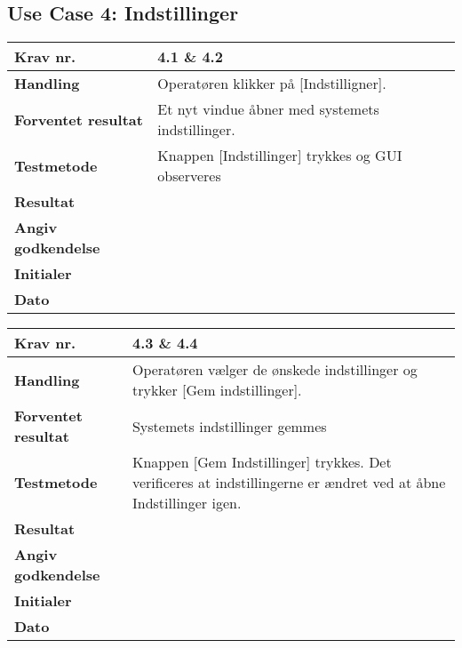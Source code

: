  \subsection{Use Case 4: Indstillinger}

	\begin{center}
		\begin{longtable}{ | m{4cm}| m{8.5cm}|} 
			\hline
			\textbf{Krav nr.} & 4.1 \& 4.2  \\ 
			\hline
			\textbf{Handling} & Operatøren klikker på [Indstilligner].  \\
			\hline
			\textbf{Forventet resultat} & Et nyt vindue åbner med systemets indstillinger. \\
			\hline
			\textbf{Testmetode}  & Knappen [Indstillinger] trykkes og GUI observeres  \\
			\hline
			\textbf{Resultat}  &    \\
			\hline
			\textbf{Angiv godkendelse} &     \\
			\hline
			\textbf{Initialer} &     \\
			\hline
			\textbf{Dato} &    \\
			\hline
		\end{longtable}
	\end{center}		
			
	\begin{center}
		\begin{longtable}{ | m{4cm}| m{8.5cm}|} 
			\hline
			\textbf{Krav nr.} & 4.3 \& 4.4 \\ 
			\hline
			\textbf{Handling} & Operatøren vælger de ønskede indstillinger og trykker [Gem indstillinger].  \\
			\hline
			\textbf{Forventet resultat} & Systemets indstillinger gemmes  \\
			\hline
			\textbf{Testmetode}  & Knappen [Gem Indstillinger] trykkes. Det verificeres at indstillingerne er ændret ved at åbne Indstillinger igen.  \\
			\hline
			\textbf{Resultat}  &    \\
			\hline
			\textbf{Angiv godkendelse} &     \\
			\hline
			\textbf{Initialer} &     \\
			\hline
			\textbf{Dato} &    \\
			\hline
		\end{longtable}
	\end{center}

